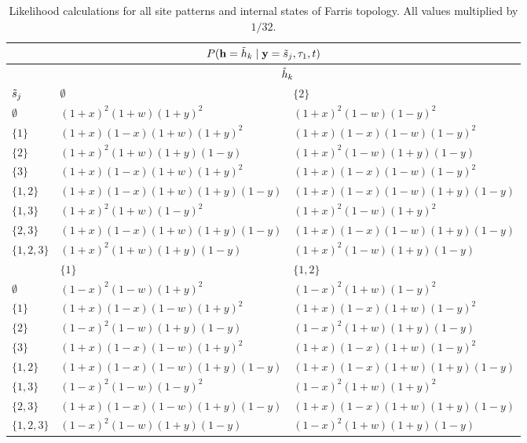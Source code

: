 \begin{table}
\centering
\begin{tabular}{|l|ll|}
\multicolumn{3}{c}{$P(\mathbf{h}=\tilde{h}_k\mid \mathbf{y}=\tilde{s}_j,\tau_1,t)$}\\
\hline
& \multicolumn{2}{|c|}{$\tilde{h}_k$}\\
    \hline
    $\tilde{s}_j$    &$\emptyset$                                &$\{2\}$  \\
    \hline
     $\emptyset$   &$(1+x)^2   (1+w)(1+y)^2$          &$(1+x)^2   (1-w)(1-y)^2$\\
     $\{1\}$       &$(1+x)(1-x)(1+w)(1+y)^2$          &$(1+x)(1-x)(1-w)(1-y)^2$\\
     $\{2\}$       &$(1+x)^2   (1+w)(1+y)(1-y)$       &$(1+x)^2   (1-w)(1+y)(1-y)$\\
     $\{3\}$       &$(1+x)(1-x)(1+w)(1+y)^2$          &$(1+x)(1-x)(1-w)(1-y)^2$\\
     $\{1,2\}$     &$(1+x)(1-x)(1+w)(1+y)(1-y)$       &$(1+x)(1-x)(1-w)(1+y)(1-y)$\\
     $\{1,3\}$     &$(1+x)^2   (1+w)(1-y)^2$          &$(1+x)^2   (1-w)(1+y)^2$\\
     $\{2,3\}$     &$(1+x)(1-x)(1+w)(1+y)(1-y)$       &$(1+x)(1-x)(1-w)(1+y)(1-y)$\\
     $\{1,2,3\}$   &$(1+x)^2   (1+w)(1+y)(1-y)$       &$(1+x)^2   (1-w)(1+y)(1-y)$\\
    \hline
    \hline
    &$\{1\}$                             &$\{1,2\}$  \\
    \hline
     $\emptyset$   &$(1-x)^2   (1-w)(1+y)^2$     &$(1-x)^2   (1+w)(1-y)^2$\\
     $\{1\}$       &$(1+x)(1-x)(1-w)(1+y)^2$     &$(1+x)(1-x)(1+w)(1-y)^2$\\
     $\{2\}$       &$(1-x)^2   (1-w)(1+y)(1-y)$  &$(1-x)^2   (1+w)(1+y)(1-y)$\\
     $\{3\}$       &$(1+x)(1-x)(1-w)(1+y)^2$     &$(1+x)(1-x)(1+w)(1-y)^2$\\
     $\{1,2\}$     &$(1+x)(1-x)(1-w)(1+y)(1-y)$  &$(1+x)(1-x)(1+w)(1+y)(1-y)$\\
     $\{1,3\}$     &$(1-x)^2   (1-w)(1-y)^2$     &$(1-x)^2   (1+w)(1+y)^2$\\
     $\{2,3\}$     &$(1+x)(1-x)(1-w)(1+y)(1-y)$  &$(1+x)(1-x)(1+w)(1+y)(1-y)$\\
     $\{1,2,3\}$   &$(1-x)^2   (1-w)(1+y)(1-y)$  &$(1-x)^2   (1+w)(1+y)(1-y)$\\
    \hline
\end{tabular}
\caption{Likelihood calculations for all site patterns and internal states of Farris topology.
All values multiplied by $1/32$.}
\label{tab:farris_likelihoods}
\end{table}

